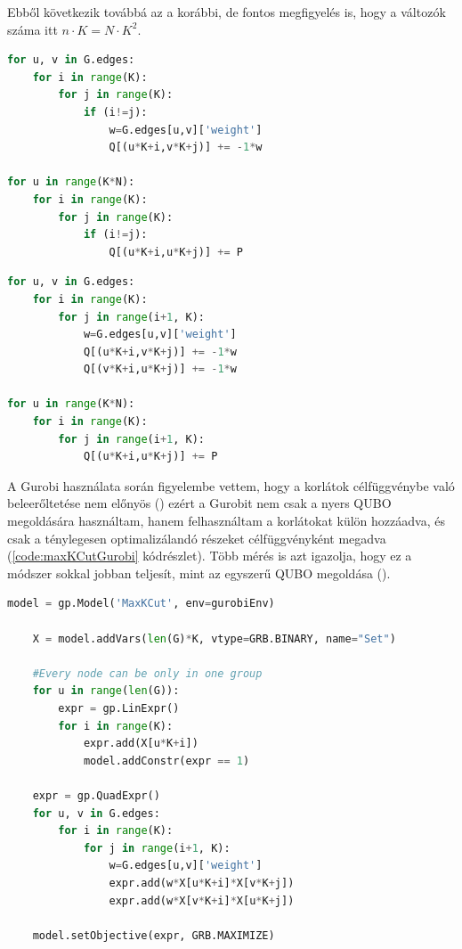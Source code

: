 Ebből következik továbbá az a korábbi, de fontos megfigyelés is, hogy a változók száma itt $n \cdot K = N \cdot K^2$.

\begin{lstlisting}[language=python,caption=Max-K-cut QUBO (szimmetrikus mátrix), label=code:maxKCutQUBOSymmetric]
for u, v in G.edges:
	for i in range(K):
		for j in range(K):
			if (i!=j):
				w=G.edges[u,v]['weight']
				Q[(u*K+i,v*K+j)] += -1*w

for u in range(K*N):
	for i in range(K):
		for j in range(K):
			if (i!=j):
				Q[(u*K+i,u*K+j)] += P 
\end{lstlisting}

\begin{lstlisting}[language=python,caption=Max-K-cut QUBO (háromszög mátrix),label=code:maxKCutQUBOTriangle]
for u, v in G.edges:
	for i in range(K):
		for j in range(i+1, K):
			w=G.edges[u,v]['weight']
			Q[(u*K+i,v*K+j)] += -1*w
			Q[(v*K+i,u*K+j)] += -1*w

for u in range(K*N):
	for i in range(K):
		for j in range(i+1, K):
			Q[(u*K+i,u*K+j)] += P
\end{lstlisting}


A Gurobi használata során figyelembe vettem, hogy a korlátok célfüggvénybe való beleerőltetése nem előnyös () ezért a Gurobit nem csak a nyers QUBO megoldására használtam, hanem felhasználtam a korlátokat külön hozzáadva, és csak a ténylegesen optimalizálandó részeket célfüggvényként megadva (\ref{code:maxKCutGurobi} kódrészlet). Több mérés is azt igazolja, hogy ez a módszer sokkal jobban teljesít, mint az egyszerű QUBO megoldása ().

\begin{lstlisting}[language=python,caption=Max-K-cut QUBO (háromszög mátrix),label=code:maxKCutGurobi]
  model = gp.Model('MaxKCut', env=gurobiEnv)

	X = model.addVars(len(G)*K, vtype=GRB.BINARY, name="Set")
	
	#Every node can be only in one group
	for u in range(len(G)):
		expr = gp.LinExpr()
		for i in range(K):
			expr.add(X[u*K+i])
			model.addConstr(expr == 1)
	
	expr = gp.QuadExpr()
	for u, v in G.edges:
		for i in range(K):
			for j in range(i+1, K):
				w=G.edges[u,v]['weight']
				expr.add(w*X[u*K+i]*X[v*K+j])
				expr.add(w*X[v*K+i]*X[u*K+j])
	
	model.setObjective(expr, GRB.MAXIMIZE)
\end{lstlisting}

